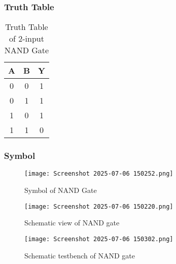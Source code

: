 \documentclass[12pt]{article}
\begin{document}
    \subsubsection{Truth Table}
        \begin{table}[H]
        \centering
        \caption{Truth Table of 2-input NAND Gate}
        \begin{tabular}{|c|c|c|}
        \hline
        \textbf{A} & \textbf{B} & \textbf{Y} \\
        \hline
        0 & 0 & 1 \\
        0 & 1 & 1 \\
        1 & 0 & 1 \\
        1 & 1 & 0 \\
        \hline
        \end{tabular}
        \end{table}

    \subsubsection{Symbol}
\begin{figure}[H]
    \centering
    \texttt{[image: Screenshot 2025-07-06 150252.png]}
    \caption{Symbol of NAND Gate}
    \label{fig:nand-symbol}
\end{figure}

        \begin{figure}[H]
            \centering
            \texttt{[image: Screenshot 2025-07-06 150220.png]}
            \caption{Schematic view of NAND gate}
            \label{fig:enter-label}
        \end{figure}
\hfill
         \begin{figure}[H]
            \centering
            \texttt{[image: Screenshot 2025-07-06 150302.png]}
            \caption{Schematic testbench of NAND gate}
            \label{fig:enter-label}
        \end{figure}
\end{document}
